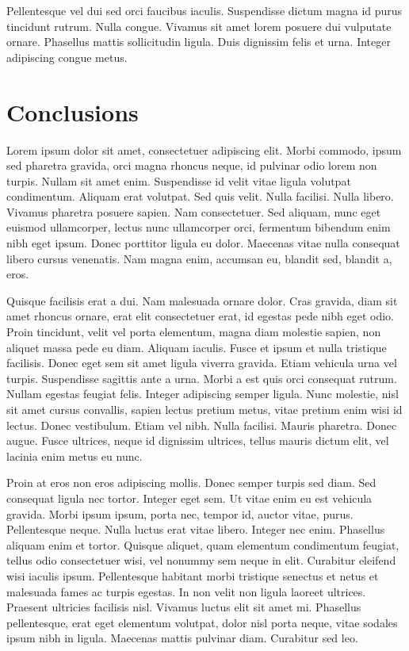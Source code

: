 \cleardoublepage
\label{chap:conclusion}

Pellentesque vel dui sed orci faucibus iaculis. Suspendisse dictum magna id purus tincidunt rutrum. Nulla congue. Vivamus sit amet lorem posuere dui vulputate ornare. Phasellus mattis sollicitudin ligula. Duis dignissim felis et urna. Integer adipiscing congue metus.
\section{Conclusions}
Lorem ipsum dolor sit amet, consectetuer adipiscing elit. Morbi commodo, ipsum sed pharetra gravida, orci magna rhoncus neque, id pulvinar odio lorem non turpis. Nullam sit amet enim. Suspendisse id velit vitae ligula volutpat condimentum. Aliquam erat volutpat. Sed quis velit. Nulla facilisi. Nulla libero. Vivamus pharetra posuere sapien. Nam consectetuer. Sed aliquam, nunc eget euismod ullamcorper, lectus nunc ullamcorper orci, fermentum bibendum enim nibh eget ipsum. Donec porttitor ligula eu dolor. Maecenas vitae nulla consequat libero cursus venenatis. Nam magna enim, accumsan eu, blandit sed, blandit a, eros.

Quisque facilisis erat a dui. Nam malesuada ornare dolor. Cras gravida, diam sit amet rhoncus ornare, erat elit consectetuer erat, id egestas pede nibh eget odio. Proin tincidunt, velit vel porta elementum, magna diam molestie sapien, non aliquet massa pede eu diam. Aliquam iaculis. Fusce et ipsum et nulla tristique facilisis. Donec eget sem sit amet ligula viverra gravida. Etiam vehicula urna vel turpis. Suspendisse sagittis ante a urna. Morbi a est quis orci consequat rutrum. Nullam egestas feugiat felis. Integer adipiscing semper ligula. Nunc molestie, nisl sit amet cursus convallis, sapien lectus pretium metus, vitae pretium enim wisi id lectus. Donec vestibulum. Etiam vel nibh. Nulla facilisi. Mauris pharetra. Donec augue. Fusce ultrices, neque id dignissim ultrices, tellus mauris dictum elit, vel lacinia enim metus eu nunc.

Proin at eros non eros adipiscing mollis. Donec semper turpis sed diam. Sed consequat ligula nec tortor. Integer eget sem. Ut vitae enim eu est vehicula gravida. Morbi ipsum ipsum, porta nec, tempor id, auctor vitae, purus. Pellentesque neque. Nulla luctus erat vitae libero. Integer nec enim. Phasellus aliquam enim et tortor. Quisque aliquet, quam elementum condimentum feugiat, tellus odio consectetuer wisi, vel nonummy sem neque in elit. Curabitur eleifend wisi iaculis ipsum. Pellentesque habitant morbi tristique senectus et netus et malesuada fames ac turpis egestas. In non velit non ligula laoreet ultrices. Praesent ultricies facilisis nisl. Vivamus luctus elit sit amet mi. Phasellus pellentesque, erat eget elementum volutpat, dolor nisl porta neque, vitae sodales ipsum nibh in ligula. Maecenas mattis pulvinar diam. Curabitur sed leo.

